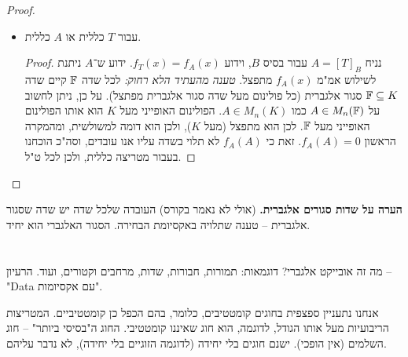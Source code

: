 \documentclass[]{../../../../tex/classes/styledArticle}
\begin{document}
\begin{proof}
\begin{itemize}
\begin{proof}
			אם $A$ ניתנת לשילוש, אז היא דומה למשולשית, והן בעלות אותו הפולינום האופייני. אז חזרה לתחילת ההוכחה. 
		\end{proof}
		\item עבור $T$ כללית או $A$ כללית. \begin{proof}
			נניח $A = [T]_B$ עבור בסיס $B$, וידוע $f_T(x) = f_A(x)$. ידוע ש־$A$ ניתנת לשילוש אמ"מ $f_A(x)$ מתפצל. \textit{טענה מהעתיד הלא רחוק: }לכל שדה $\mathbb{F}$ קיים שדה $\mathbb{F} \subseteq K$ סגור אלגברית (כל פולינום מעל שדה סגור אלגברית מפתצל). על כן, ניתן לחשוב על $A \in M_n(\mathbb{F})$ כמו $A \in M_n(K)$. הפולינום האופייני מעל $K$ הוא אותו הפולינום האופייני מעל $\mathbb{F}$. לכן הוא מתפצל (מעל $K$), ולכן הוא דומה למשולשית, ומהמקרה הראשון $f_A(A) = 0$. זאת כי $f_A(A)$ לא תלוי בשדה עליו אנו עובדים, וסה"כ הוכחנו בעבור מטריצה כללית, ולכן לכל ט"ל. 
		\end{proof}
	\end{itemize}
	\end{proof}
	
	\textbf{הערה על שדות סגורים אלגברית. }(אולי לא נאמר בקורס) העובדה שלכל שדה יש שדה שסגור אלגברית – טענה שתלויה באקסיומת הבחירה. הסגור האלגברי הוא יחיד. 
	
	\section{}
	מה זה אובייקט אלגברי? דוגמאות: תמורות, חבורות, שדות, מרחבים וקטורים, ועוד. הרעיון – "Data עם אקסיומות". 
	
	
	אנחנו נתעניין ספצפית בחוגים קומטטיבים, כלומר, בהם הכפל כן קומטטיביים. המטריצות הריבועיות מעל אותו הגודל, לדוגמה, הוא חוג שאיננו קומטטיבי. החוג ה"בסיסי ביותר" – חוג השלמים (אין הופכי). ישנם חוגים בלי יחידה (לדוגמה הזוגיים בלי יחידה), לא נדבר עליהם. 
	
	\ndoc
\end{document}
